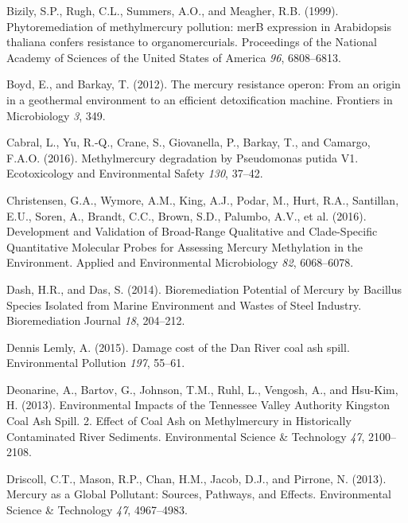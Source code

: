 \documentclass[ms]{uncgdissertationexp}
\theoremstyle{plain}
\theoremstyle{definition}
\theoremstyle{remark}
\begin{document}
  \hypertarget{ref-bizilyPhytoremediationMethylmercuryPollution1999}{}
  Bizily, S.P., Rugh, C.L., Summers, A.O., and Meagher, R.B. (1999).
  Phytoremediation of methylmercury pollution: merB expression in
  Arabidopsis thaliana confers resistance to organomercurials. Proceedings
  of the National Academy of Sciences of the United States of America
  \emph{96}, 6808--6813.
  
  \hypertarget{ref-boydMercuryResistanceOperon2012}{}
  Boyd, E., and Barkay, T. (2012). The mercury resistance operon: From an
  origin in a geothermal environment to an efficient detoxification
  machine. Frontiers in Microbiology \emph{3}, 349.
  
  \hypertarget{ref-cabralMethylmercuryDegradationPseudomonas2016}{}
  Cabral, L., Yu, R.-Q., Crane, S., Giovanella, P., Barkay, T., and
  Camargo, F.A.O. (2016). Methylmercury degradation by Pseudomonas putida
  V1. Ecotoxicology and Environmental Safety \emph{130}, 37--42.
  
  \hypertarget{ref-christensenDevelopmentValidationBroadRange2016}{}
  Christensen, G.A., Wymore, A.M., King, A.J., Podar, M., Hurt, R.A.,
  Santillan, E.U., Soren, A., Brandt, C.C., Brown, S.D., Palumbo, A.V., et
  al. (2016). Development and Validation of Broad-Range Qualitative and
  Clade-Specific Quantitative Molecular Probes for Assessing Mercury
  Methylation in the Environment. Applied and Environmental Microbiology
  \emph{82}, 6068--6078.
  
  \hypertarget{ref-dashBioremediationPotentialMercury2014}{}
  Dash, H.R., and Das, S. (2014). Bioremediation Potential of Mercury by
  Bacillus Species Isolated from Marine Environment and Wastes of Steel
  Industry. Bioremediation Journal \emph{18}, 204--212.
  
  \hypertarget{ref-dennislemlyDamageCostDan2015}{}
  Dennis Lemly, A. (2015). Damage cost of the Dan River coal ash spill.
  Environmental Pollution \emph{197}, 55--61.
  
  \hypertarget{ref-deonarineEnvironmentalImpactsTennessee2013}{}
  Deonarine, A., Bartov, G., Johnson, T.M., Ruhl, L., Vengosh, A., and
  Hsu-Kim, H. (2013). Environmental Impacts of the Tennessee Valley
  Authority Kingston Coal Ash Spill. 2. Effect of Coal Ash on
  Methylmercury in Historically Contaminated River Sediments.
  Environmental Science \& Technology \emph{47}, 2100--2108.
  
  \hypertarget{ref-driscollMercuryGlobalPollutant2013}{}
  Driscoll, C.T., Mason, R.P., Chan, H.M., Jacob, D.J., and Pirrone, N.
  (2013). Mercury as a Global Pollutant: Sources, Pathways, and Effects.
  Environmental Science \& Technology \emph{47}, 4967--4983.
  
\end{document}
